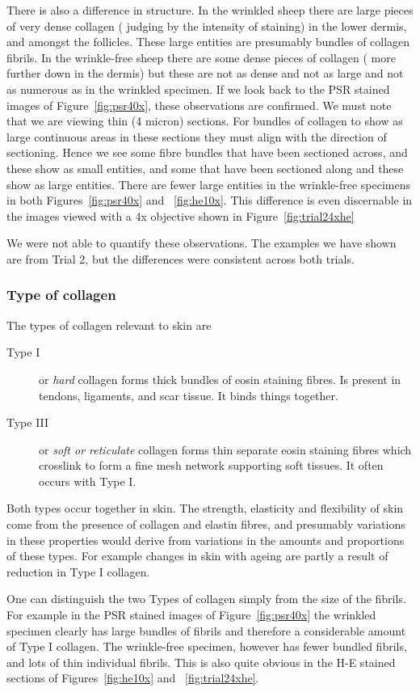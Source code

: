 \documentclass[titlepage]{article}  %
\begin{document}
There is also a difference in structure. In the wrinkled sheep there are large pieces of very dense collagen ( judging by the intensity of staining)  in the lower dermis, and amongst the follicles. These large entities are presumably bundles of collagen fibrils. In the wrinkle-free sheep there are some dense pieces of collagen ( more further down in the dermis) but these are not as dense and not as large and not as numerous as in the wrinkled specimen. If we look back to the PSR stained images of Figure~\ref{fig:psr40x}, these observations are confirmed. We must note that we are viewing thin (4 micron) sections. For bundles of collagen to show as large continuous areas in these sections they must align with the direction of sectioning. Hence we see some fibre bundles that have been sectioned across, and these show as small entities, and some that have been sectioned along and these show as large entities. There are fewer large entities in the wrinkle-free specimens in both Figures~\ref{fig:psr40x} and ~\ref{fig:he10x}. This difference is even discernable in the images viewed with a 4x objective shown in Figure~\ref{fig:trial24xhe}

We were not able to quantify these observations. The examples we have shown are from Trial 2, but the differences were consistent across both trials.

\subsubsection{Type of collagen}
The types of collagen relevant to skin are
\begin{description}
\item[Type I] or {\em hard} collagen forms thick bundles of eosin staining fibres. Is present in tendons, ligaments, and scar tissue. It binds things together.
\item[Type III] or {\em soft or reticulate} collagen forms thin separate  eosin staining fibres which crosslink to form a fine mesh network supporting soft tissues.  It often occurs with Type I.
\end{description}
Both types occur together in skin. The strength, elasticity  and flexibility of skin come from the presence of collagen and elastin fibres, and presumably variations in these properties would derive from variations in the amounts and proportions of these types. For example changes in skin with ageing are partly a result of reduction in Type I collagen.

One can distinguish the two Types of collagen simply from the size of the fibrils. For example in  the PSR stained images of Figure~\ref{fig:psr40x} the wrinkled specimen clearly has large bundles of fibrils and therefore a considerable amount of Type I collagen. The wrinkle-free specimen, however has fewer bundled fibrils, and lots of thin individual fibrils. This is also quite obvious in the H-E stained sections of Figures~\ref{fig:he10x} and ~\ref{fig:trial24xhe}.
\end{document}
